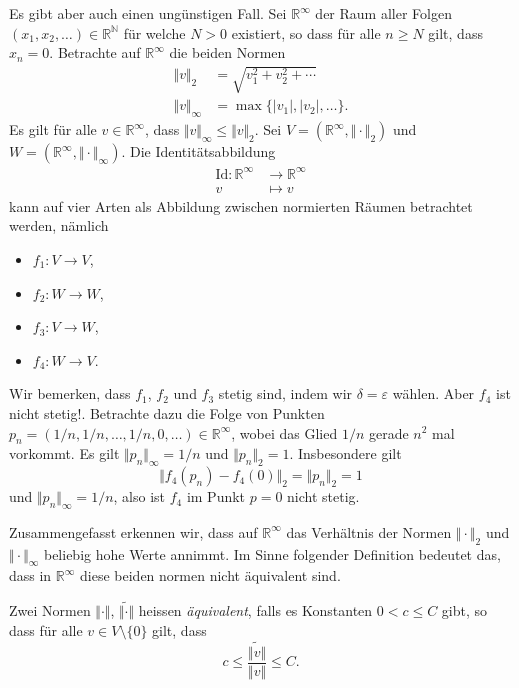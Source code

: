 \documentclass[../main.tex]{subfiles}
\begin{document}
Es gibt aber auch einen ungünstigen Fall.
Sei $\mathbb{R}^{\infty}$ der Raum aller Folgen
$(x_{1}, x_{2}, \dots) \in \mathbb{R}^{\mathbb{N}}$ 
für welche $N > 0$ existiert, so dass für alle $n \geq N$ 
gilt, dass $x_n = 0$.
Betrachte auf $\mathbb{R}^{\infty}$ die beiden Normen
\begin{align*}
  \Vert v \Vert_2 & = \sqrt{v_1^2 + v_2^2 + \cdots} \\
  \Vert v \Vert_{\infty} &= \max \{|v_1|, |v_2|, \dots\}.
\end{align*}
Es gilt für alle $v \in \mathbb{R}^{\infty}$,
dass $\Vert v \Vert_{\infty} \leq \Vert v \Vert_2$.
Sei $V = (\mathbb{R}^{\infty}, \Vert \cdot \Vert_2)$ 
und $W = (\mathbb{R}^{\infty}, \Vert \cdot \Vert_{\infty})$.
Die Identitätsabbildung
\begin{align*}
  \text{Id} \colon \mathbb{R}^{\infty} & \to \mathbb{R}^{\infty} \\
  v & \mapsto v
\end{align*}
kann auf vier Arten als Abbildung zwischen normierten Räumen
betrachtet werden, nämlich
\begin{itemize}
  \item $f_1 \colon V \to V$,
  \item $f_2 \colon W \to W$,
  \item $f_3 \colon V \to W$,
  \item $f_4 \colon W \to V$.
\end{itemize}
Wir bemerken, dass $f_1$, $f_2$ und $f_3$ stetig
sind, indem wir $\delta = \varepsilon$ wählen.
Aber $f_4$ ist nicht stetig!.
Betrachte dazu die Folge von Punkten
$p_n = (1/n, 1/n, \dots, 1/n, 0, \dots) \in \mathbb{R}^{\infty}$,
wobei das Glied $1/n$ gerade $n^2$ mal vorkommt.
Es gilt $\Vert p_n \Vert_{\infty} = 1/n$ 
und $\Vert p_n \Vert_{2} = 1$.
Insbesondere gilt
\[
  \Vert f_4(p_n) - f_4(0) \Vert_2 = \Vert p_n \Vert_2 = 1
\]
und $\Vert p_n \Vert_{\infty} = 1/n$,
also ist $f_4$ im Punkt $p = 0$ nicht stetig.

Zusammengefasst erkennen wir, dass auf $\mathbb{R}^{\infty}$ 
das Verhältnis der Normen $\Vert \cdot \Vert_2$ 
und $\Vert \cdot \Vert_{\infty}$ beliebig hohe Werte annimmt.
Im Sinne folgender Definition bedeutet das, dass in
$\mathbb{R}^{\infty}$ diese beiden normen nicht äquivalent sind.

\begin{definition}
  Zwei Normen $\Vert \cdot \Vert$, $\widetilde{\Vert \cdot \Vert}$
  heissen \emph{äquivalent},
  falls es Konstanten $0 < c \leq C$ gibt,
  so dass für alle $v \in V \setminus \{0\}$ gilt, dass
  \[
    c \leq \frac{\widetilde{\Vert v \Vert}}{\Vert v \Vert} \leq C.
  \]
\end{definition}
\end{document}
